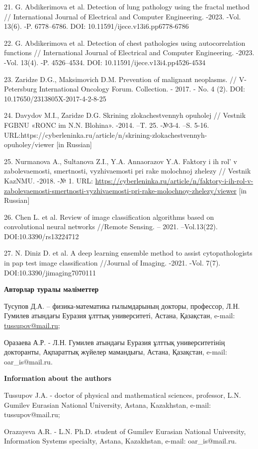 21. G. Abdikerimova et al. Detection of lung pathology using the fractal
method // International Journal of Electrical and Computer Engineering.
-2023. -Vol. 13(6). -P. 6778--6786. DOI:
10.11591/ijece.v13i6.pp6778-6786

22. G. Abdikerimova et al. Detection of chest pathologies using
autocorrelation functions // International Journal of Electrical and
Computer Engineering. -2023. -Vol. 13(4). -P. 4526--4534. DOI:
10.11591/ijece.v13i4.pp4526-4534

23. Zaridze D.G., Maksimovich D.M. Prevention of malignant neoplasms. //
V-Petersburg International Oncology Forum. Collection. - 2017. - No. 4
(2). DOI: 10.17650/2313805X-2017-4-2-8-25

24. Davydov M.I., Zaridze D.G. Skrining zlokachestvennyh opuholej //
Vestnik FGBNU «RONC im N.N. Blohina». -2014. --T. 25. -№3-4. --S. 5-16.
URL:https://cyberleninka.ru/article/n/skrining-zlokachestvennyh-opuholey/viewer
{[}in Russian{]}

25. Nurmanova A., Sultanova Z.I., Y.A. Annaorazov Y.A. Faktory i ih
rol'{} v zabolevaemosti, smertnosti, vyzhivaemosti pri
rake molochnoj zhelezy // Vestnik KazNMU. -2018. -№ 1. URL:
\url{https://cyberleninka.ru/article/n/faktory-i-ih-rol-v-zabolevaemosti-smertnosti-vyzhivaemosti-pri-rake-molochnoy-zhelezy/viewer}
{[}in Russian{]}

26. Chen L. et al. Review of image classification algorithms based on
convolutional neural networks //Remote Sensing. -- 2021. --Vol.13(22).
DOI:10.3390/rs13224712

27. N. Diniz D. et al. A deep learning ensemble method to assist
cytopathologists in pap test image classification //Journal of Imaging.
-2021. -Vol. 7(7). DOI:10.3390/jimaging7070111

{\bfseries Авторлар туралы мәліметтер}

Тусупов Д.А. -- физика-математика ғылымдарының докторы, профессор, Л.Н.
Гумилев атындағы Еуразия ұлттық университеті, Астана, Қазақстан, e-mail:
\href{mailto:oaris.83@gmail.com}{tussupov@mail.ru};

Оразаева А.Р. - Л.Н. Гумилев атындағы Еуразия ұлттық университетінің
докторанты, Ақпараттық жүйелер мамандығы, Астана, Қазақстан, e-mail:
oar\_is@mail.ru.

{\bfseries Information about the authors}

Tussupov J.A. - doctor of physical and mathematical sciences, professor,
L.N. Gumilev Eurasian National University, Astana, Kazakhstan, e-mail:
tussupov@mail.ru;

Orazayeva A.R. - L.N. Ph.D. student of Gumilev Eurasian National
University, Information Systems specialty, Astana, Kazakhstan, e-mail:
oar\_is@mail.ru.
